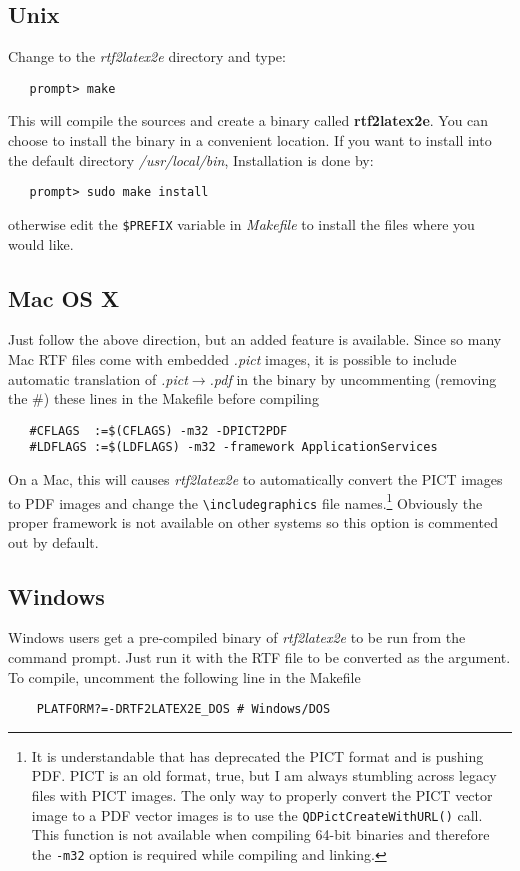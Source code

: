 \documentclass{article}
\def\rtf2latex2e{{\it rtf2latex2e}}
\begin{document}
\subsection{Unix \label{Unix_install}}
Change to the \textit{rtf2latex2e} directory and type:
\begin{verbatim}
   prompt> make
\end{verbatim}
This will compile the sources and create a binary called
\textbf{rtf2latex2e}.
You can choose to install the binary in a convenient location.
If you want to install into the default directory
\textit{/usr/local/bin},
Installation is done by:
\begin{verbatim}
   prompt> sudo make install
\end{verbatim}
otherwise edit the \texttt{\$PREFIX} variable in \textit{Makefile}
to install the files where you would like. 

\subsection{Mac OS X}
Just follow the above direction, but an added feature is available.
Since so many Mac RTF files come with embedded \textit{.pict} images, 
it is possible to include automatic translation of \textit{.pict}$\rightarrow$\textit{.pdf}
in the binary by uncommenting (removing the \#) these lines in the Makefile before
compiling
\begin{verbatim}
   #CFLAGS  :=$(CFLAGS) -m32 -DPICT2PDF
   #LDFLAGS :=$(LDFLAGS) -m32 -framework ApplicationServices
\end{verbatim}
On a Mac, this will causes {\rtf2latex2e} to automatically convert the PICT images to PDF images
and change the \verb#\includegraphics# file names.\footnote{It is understandable that 
has deprecated the PICT format and is pushing PDF.  PICT is an old format, true,
but I am always stumbling across legacy files with PICT images.  The only way to properly
convert the PICT vector image to a PDF vector images is to use the \texttt{QDPictCreateWithURL()}
call.  This function is not available when compiling 64-bit binaries and therefore the \texttt{-m32}
option is required while compiling and linking. }  Obviously the proper framework is
not available on other systems so this option is commented out by default.

\subsection{Windows}
Windows users get a pre-compiled binary of \rtf2latex2e to be run from
the command prompt. Just run it with the RTF file to be converted as the argument.
To compile, uncomment the following line in the Makefile
\begin{verbatim}
    PLATFORM?=-DRTF2LATEX2E_DOS # Windows/DOS
\end{verbatim}
\end{document}
